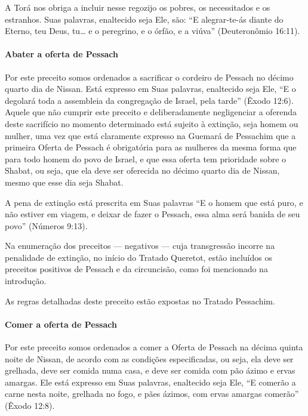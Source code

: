 A Torá nos obriga a incluir nesse regozijo os pobres, os necessitados
e os estranhos. Suas palavras, enaltecido seja Ele, são: ``E
alegrar-te-ás diante do Eterno, teu Deus, tu\ldots{} e o peregrino, e o
órfão, e a viúva'' (Deuteronômio 16:11).

\paragraph{Abater a oferta de Pessach}

Por este preceito somos ordenados a sacrificar o cordeiro de Pessach
no décimo quarto dia de Nissan. Está expresso em Suas palavras,
enaltecido seja Ele, ``E o degolará toda a assembleia da congregação de
Israel, pela tarde'' (Êxodo 12:6). Aquele que não cumprir este preceito
e deliberadamente negligenciar a oferenda deste sacrifício no momento
determinado está sujeito à extinção, seja homem ou mulher, uma vez que
está claramente expresso na Guemará de Pessachim que a primeira Oferta
de Pessach é obrigatória para as mulheres da mesma forma que para
todo homem do povo de Israel, e que essa oferta tem prioridade sobre o
Shabat, ou seja, que ela deve ser oferecida no décimo quarto dia de
Nissan, mesmo que esse dia seja Shabat.

A pena de extinção está prescrita em Suas palavras ``E o homem que está
puro, e não estiver em viagem, e deixar de fazer o Pessach, essa alma
será banida de seu povo'' (Números 9:13).

Na enumeração dos preceitos --- negativos --- cuja transgressão incorre
na penalidade de extinção, no início do Tratado Queretot, estão
incluídos os preceitos positivos de Pessach e da circuncisão, como
foi mencionado na introdução.

As regras detalhadas deste preceito estão expostas no Tratado Pessachim.

\paragraph{Comer a oferta de Pessach}

Por este preceito somos ordenados a comer a Oferta de Pessach na
décima quinta noite de Nissan, de acordo com as condições especificadas,
ou seja, ela deve ser grelhada, deve ser comida numa casa, e deve ser
comida com pão ázimo e ervas amargas. Ele está expresso em Suas
palavras, enaltecido seja Ele, ``E comerão a carne nesta noite, grelhada
no fogo, e pães ázimos, com ervas amargas comerão'' (Êxodo 12:8).

